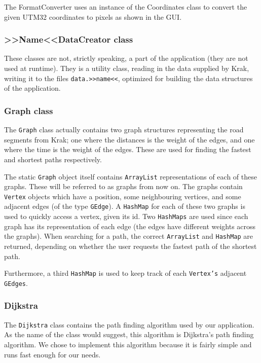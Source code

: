 The FormatConverter uses an instance of the Coordinates class to convert the given UTM32 coordinates to pixels as shown in the GUI.

\subsubsection{>>Name<<DataCreator class}
These classes are not, strictly speaking, a part of the application (they are not used at runtime). They is a utility class, reading in the data supplied by Krak, writing it to the files \texttt{data.>>name<<}, optimized for building the data structures of the application.

\subsubsection{Graph class}
The \texttt{Graph} class actually contains two graph structures representing the road segments from Krak; one where the distances is the weight of the edges, and one where the time is the weight of the edges. These are used for finding the fastest and shortest paths respectively.
	
The static \texttt{Graph} object itself contains \texttt{ArrayList} representations of each of these graphs. These will be referred to as graphs from now on. The graphs contain \texttt{Vertex} objects which have a position, some neighbouring vertices, and some adjacent edges (of the type \texttt{GEdge}). A \texttt{HashMap} for each of these two graphs is used to quickly access a vertex, given its id. Two \texttt{HashMaps} are used since each graph has its representation of each edge (the edges have different weights across the graphs). When searching for a path, the correct \texttt{ArrayList} and \texttt{HashMap} are returned, depending on whether the user requests the fastest path of the shortest path.

Furthermore, a third \texttt{HashMap} is used to keep track of each \texttt{Vertex's} adjacent \texttt{GEdges}.

\subsubsection{Dijkstra}
The \texttt{Dijkstra} class contains the path finding algorithm used by our application. As the name of the class would suggest, this algorithm is Dijkstra's path finding algorithm. We chose to implement this algorithm because it is fairly simple and runs fast enough for our needs.
